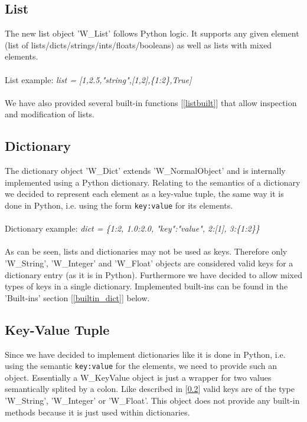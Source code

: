 \documentclass{article}
\begin{document}
\subsection{List}
The new list object 'W\_List' follows Python logic. It supports any given element (list of lists/dicts/strings/ints/floats/booleans) as well as lists with mixed elements.\\
\\ List example: \textit{list = [1,2.5,"string",[1,2],\{1:2\},True]} \\\\
We have also provided several built-in functions [\ref{listbuilt}] that allow inspection and modification of lists.

\subsection{Dictionary}
\label{dicts}
The dictionary object 'W\_Dict' extends 'W\_NormalObject' and is internally implemented using a Python dictionary.
Relating to the semantics of a dictionary we decided to represent each element as a key-value tuple, the same way it is done in Python, i.e. using the form \texttt{key:value} for its elements. \\\\ Dictionary example: \textit{dict = \{1:2, 1.0:2.0, "key":"value", 2:[1], 3:\{1:2\}\}} \\\\
As can be seen, lists and dictionaries may not be used as keys. Therefore only 'W\_String', 'W\_Integer' and 'W\_Float' objects are considered valid keys for a dictionary entry (as it is in Python). Furthermore we have decided to allow mixed types of keys in a single dictionary. Implemented built-ins can be found in the 'Built-ins' section [\ref{builtin_dict}] below.

\subsection{Key-Value Tuple}
Since we have decided to implement dictionaries like it is done in Python, i.e. using the semantic \texttt{key:value} for the elements, we need to provide such an object.
Essentially a W\_KeyValue object is just a wrapper for two values semantically splited by a colon.
Like described in [\ref{dicts}] valid keys are of the type 'W\_String', 'W\_Integer' or 'W\_Float'. This object does not provide any built-in methods because it is just used within dictionaries.
\end{document}
